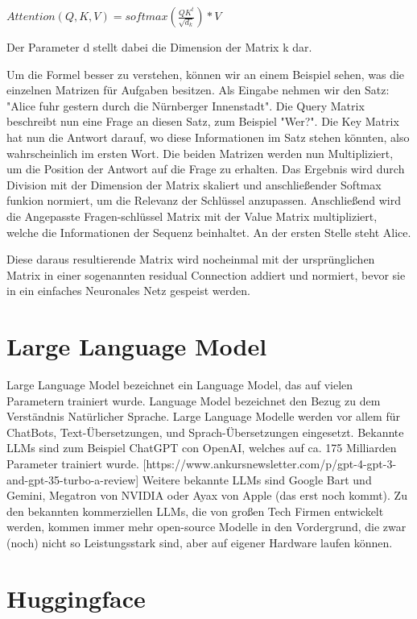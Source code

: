 $Attention(Q,K,V)=softmax(\frac{QK^t}{\sqrt{d_k}})*V$

Der Parameter d stellt dabei die Dimension der Matrix k dar.


Um die Formel besser zu verstehen, können wir an einem Beispiel sehen, was die einzelnen Matrizen für Aufgaben besitzen.
Als Eingabe nehmen wir den Satz: "Alice fuhr gestern durch die Nürnberger Innenstadt".
Die Query Matrix beschreibt nun eine Frage an diesen Satz, zum Beispiel "Wer?".
Die Key Matrix hat nun die Antwort darauf, wo diese Informationen im Satz stehen könnten, also wahrscheinlich im ersten Wort. 
Die beiden Matrizen werden nun Multipliziert, um die Position der Antwort auf die Frage zu erhalten. 
Das Ergebnis wird durch Division mit der Dimension der Matrix skaliert und anschließender Softmax funkion normiert, um die Relevanz der Schlüssel anzupassen.
Anschließend wird die Angepasste Fragen-schlüssel Matrix mit der Value Matrix multipliziert, welche die Informationen der Sequenz beinhaltet. 
An der ersten Stelle steht Alice.

Diese daraus resultierende Matrix wird nocheinmal mit der ursprünglichen Matrix in einer sogenannten residual Connection addiert und normiert, bevor sie in ein einfaches Neuronales Netz gespeist werden.

\section{Large Language Model}

Large Language Model bezeichnet ein Language Model, das auf vielen Parametern trainiert wurde. 
Language Model bezeichnet den Bezug zu dem Verständnis Natürlicher Sprache.
Large Language Modelle werden vor allem für ChatBots, Text-Übersetzungen, und Sprach-Übersetzungen eingesetzt.
Bekannte LLMs sind zum Beispiel ChatGPT con OpenAI, welches auf ca. 175 Milliarden Parameter trainiert wurde. [https://www.ankursnewsletter.com/p/gpt-4-gpt-3-and-gpt-35-turbo-a-review]
Weitere bekannte LLMs sind Google Bart und Gemini, Megatron von NVIDIA oder Ayax von Apple (das erst noch kommt).
Zu den bekannten kommerziellen LLMs, die von großen Tech Firmen entwickelt werden, kommen immer mehr open-source Modelle in den Vordergrund, die zwar (noch) nicht so Leistungsstark sind, aber auf eigener Hardware laufen können.



\section{Huggingface}

